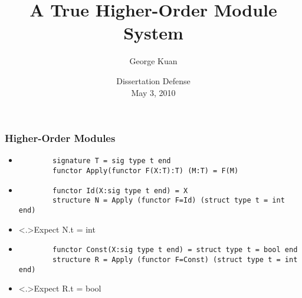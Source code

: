 \documentclass{beamer}
\title[A True Higher-Order Module System]{A True Higher-Order Module System}
\author{George Kuan}
\date{Dissertation Defense\\ May 3, 2010}
\begin{document}
	
	\begin{frame}
		\maketitle
	\end{frame}

	\begin{frame}[fragile]
		\frametitle{Higher-Order Modules}
		\begin{itemize}[<+->] 
			\item[]
		\begin{lstlisting}
		signature T = sig type t end
		functor Apply(functor F(X:T):T) (M:T) = F(M)
		\end{lstlisting}
			\item[]
		\begin{lstlisting}
		functor Id(X:sig type t end) = X
		structure N = Apply (functor F=Id) (struct type t = int end)
		\end{lstlisting}
			\item[] \alert<.>{Expect N.t = int}
			\item[]
		\begin{lstlisting}
		functor Const(X:sig type t end) = struct type t = bool end
		structure R = Apply (functor F=Const) (struct type t = int end)
		\end{lstlisting}
			\item[] \alert<.>{Expect R.t = bool}
		\end{itemize}
	\end{frame}
	
\end{document}
